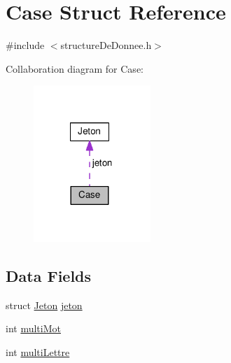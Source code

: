 \hypertarget{struct_case}{\section{Case Struct Reference}
\label{struct_case}
}


{\ttfamily \#include $<$structure\-De\-Donnee.\-h$>$}



Collaboration diagram for Case\-:\nopagebreak
\begin{figure}[H]
\begin{center}
\leavevmode
\includegraphics[width=125pt]{struct_case__coll__graph}
\end{center}
\end{figure}
\subsection*{Data Fields}
\begin{DoxyCompactItemize}
\item 
struct \hyperlink{struct_jeton}{Jeton} \hyperlink{struct_case_a9f4b5819c5c0a86e2652b81fef1daada}{jeton}
\item 
int \hyperlink{struct_case_a221f7ea49ba6862c68e57d4f3771d649}{multi\-Mot}
\item 
int \hyperlink{struct_case_a6f17e7aa98aefcb66a93b9933e3eb107}{multi\-Lettre}
\end{DoxyCompactItemize}


